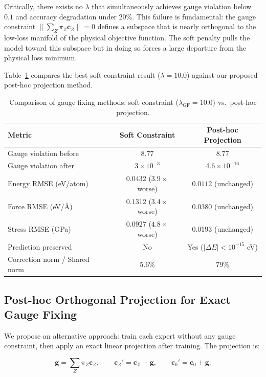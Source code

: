 \documentclass[twoside,prb,aps,floatfix,superscriptaddress,longbibliography]{revtex4-2}
\newcommand{\AAng}{\mbox{\AA}}
\newcommand{\g}{\mathbf{g}}
\newcommand{\cZ}{\mathbf{c}_{Z}}
\newcommand{\cb}{\mathbf{c}_{0}}
\begin{document}
Critically, there exists no $\lambda$ that simultaneously achieves gauge violation below $0.1$ and accuracy degradation under $20\%$. This failure is fundamental: the gauge constraint $\lVert \sum_Z \pi_Z \cZ \rVert = 0$ defines a subspace that is nearly orthogonal to the low-loss manifold of the physical objective function. The soft penalty pulls the model toward this subspace but in doing so forces a large departure from the physical loss minimum.

Table~\ref{tab:gauge_methods} compares the best soft-constraint result ($\lambda = 10.0$) against our proposed post-hoc projection method.

\begin{table}[t]
\caption{Comparison of gauge fixing methods: soft constraint ($\lambda_{\mathrm{GF}} = 10.0$) vs.\ post-hoc projection.}
\label{tab:gauge_methods}
\begin{ruledtabular}
\begin{tabular}{lcc}
\toprule
Metric & Soft Constraint & Post-hoc Projection \\
\midrule
Gauge violation before & $8.77$ & $8.77$ \\
Gauge violation after & $3\times10^{-3}$ & $4.6\times10^{-16}$ \\
Energy RMSE (eV/atom) & $0.0432$ ($3.9\times$ worse) & $0.0112$ (unchanged) \\
Force RMSE (eV/\AAng) & $0.1312$ ($3.4\times$ worse) & $0.0380$ (unchanged) \\
Stress RMSE (GPa) & $0.0927$ ($4.8\times$ worse) & $0.0193$ (unchanged) \\
Prediction preserved & No & Yes ($|\Delta E| < 10^{-15}$ eV) \\
Correction norm / Shared norm & $5.6\%$ & $79\%$ \\
\bottomrule
\end{tabular}
\end{ruledtabular}
\end{table}

\subsection{Post-hoc Orthogonal Projection for Exact Gauge Fixing}

We propose an alternative approach: train each expert without any gauge constraint, then apply an exact linear projection after training. The projection is:

\begin{equation}
\g = \sum_Z \pi_Z \cZ, \qquad
\cZ' = \cZ - \g, \qquad
\cb' = \cb + \g.
\label{eq:posthoc_projection}
\end{equation}
\end{document}
